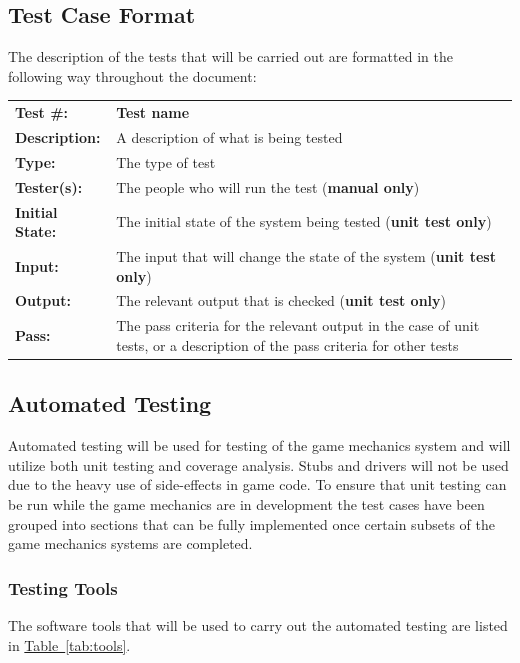 \documentclass[12pt, titlepage]{article}
\begin{document}
\subsection{Test Case Format}
The description of the tests that will be carried out are formatted in the following way throughout the document:

\begin{mdframed}[linewidth=1pt]
\begin{tabularx}{\textwidth}{@{}p{3cm}X@{}}
{\bf Test \#:} & {\bf Test name}\\[\baselineskip]
{\bf Description:} & A description of what is being tested\\[0.5\baselineskip]
{\bf Type:} & The type of test\\[0.5\baselineskip]
{\bf Tester(s):} & The people who will run the test ({\bf manual only})\\[0.5\baselineskip]
{\bf Initial State:} & The initial state of the system being tested ({\bf unit test only})\\[0.5\baselineskip]
{\bf Input:} &  The input that will change the state of the system ({\bf unit test only})\\[0.5\baselineskip]
{\bf Output:} & The relevant output that is checked ({\bf unit test only})\\[0.5\baselineskip]
{\bf Pass:} & The pass criteria for the relevant output in the case of unit tests, or a description of the pass criteria for other tests
\end{tabularx}
\end{mdframed}

\subsection{Automated Testing}
Automated testing will be used for testing of the game mechanics system and will utilize both unit testing and coverage analysis.  Stubs and drivers will not be used due to the heavy use of side-effects in game code.  To ensure that unit testing can be run while the game mechanics are in development the test cases have been grouped into sections that can be fully implemented once certain subsets of the game mechanics systems are completed.

\subsubsection{Testing Tools}
The software tools that will be used to carry out the automated testing are listed in \hyperref[tab:tools]{Table~\ref*{tab:tools}}.
\end{document}

